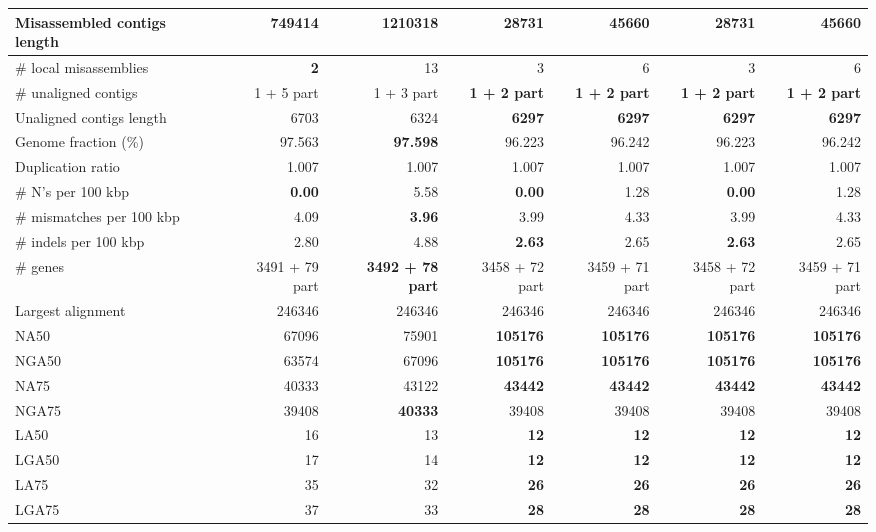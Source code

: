 \documentclass[12pt,a4paper]{article}
\begin{document}
\begin{table}[ht]
\begin{center}
\begin{tabular}{|l*{6}{|r}|}
Misassembled contigs length & 749414 & 1210318 & {\bf 28731} & 45660 & {\bf 28731} & 45660 \\ \hline
\# local misassemblies & {\bf 2} & 13 & 3 & 6 & 3 & 6 \\ \hline
\# unaligned contigs & 1 + 5 part & 1 + 3 part & {\bf 1 + 2 part} & {\bf 1 + 2 part} & {\bf 1 + 2 part} & {\bf 1 + 2 part} \\ \hline
Unaligned contigs length & 6703 & 6324 & {\bf 6297} & {\bf 6297} & {\bf 6297} & {\bf 6297} \\ \hline
Genome fraction (\%) & 97.563 & {\bf 97.598} & 96.223 & 96.242 & 96.223 & 96.242 \\ \hline
Duplication ratio & 1.007 & 1.007 & 1.007 & 1.007 & 1.007 & 1.007 \\ \hline
\# N's per 100 kbp & {\bf 0.00} & 5.58 & {\bf 0.00} & 1.28 & {\bf 0.00} & 1.28 \\ \hline
\# mismatches per 100 kbp & 4.09 & {\bf 3.96} & 3.99 & 4.33 & 3.99 & 4.33 \\ \hline
\# indels per 100 kbp & 2.80 & 4.88 & {\bf 2.63} & 2.65 & {\bf 2.63} & 2.65 \\ \hline
\# genes & 3491 + 79 part & {\bf 3492 + 78 part} & 3458 + 72 part & 3459 + 71 part & 3458 + 72 part & 3459 + 71 part \\ \hline
Largest alignment & 246346 & 246346 & 246346 & 246346 & 246346 & 246346 \\ \hline
NA50 & 67096 & 75901 & {\bf 105176} & {\bf 105176} & {\bf 105176} & {\bf 105176} \\ \hline
NGA50 & 63574 & 67096 & {\bf 105176} & {\bf 105176} & {\bf 105176} & {\bf 105176} \\ \hline
NA75 & 40333 & 43122 & {\bf 43442} & {\bf 43442} & {\bf 43442} & {\bf 43442} \\ \hline
NGA75 & 39408 & {\bf 40333} & 39408 & 39408 & 39408 & 39408 \\ \hline
LA50 & 16 & 13 & {\bf 12} & {\bf 12} & {\bf 12} & {\bf 12} \\ \hline
LGA50 & 17 & 14 & {\bf 12} & {\bf 12} & {\bf 12} & {\bf 12} \\ \hline
LA75 & 35 & 32 & {\bf 26} & {\bf 26} & {\bf 26} & {\bf 26} \\ \hline
LGA75 & 37 & 33 & {\bf 28} & {\bf 28} & {\bf 28} & {\bf 28} \\ \hline
\end{tabular}
\end{center}
\end{table}
\end{document}
